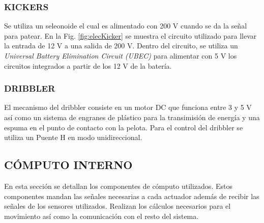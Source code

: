 \documentclass[twocolumn,10pt]{amrob}
\begin{document}
\subsubsection*{KICKERS}
Se utiliza un seleonoide el cual es alimentado con 200 V cuando se da la señal para patear. En la Fig. \ref{fig:elecKicker} se muestra el circuito utilizado para llevar la entrada de 12 V a una salida de 200 V. Dentro del circuito, se utiliza un \textit{Universal Battery Elimination Circuit (UBEC)} para alimentar con 5 V los circuitos integrados a partir de los 12 V de la batería. \par
\subsubsection*{DRIBBLER}
El mecanismo del dribbler consiste en un motor DC que funciona entre 3 y 5 V así como un sistema de engranes de plástico para la transimisión de energía y una espuma en el punto de contacto con la pelota. Para el control del dribbler se utiliza un Puente H en modo unidireccional. \par 

\subsection*{CÓMPUTO INTERNO}
En esta sección se detallan los componentes de cómputo utilizados. Estos componentes mandan las señales necesarias a cada actuador además de recibir las señales de los sensores utilizados. Realizan los cálculos necesarios para el movimiento así como la comunicación con el resto del sistema.  
\end{document}
